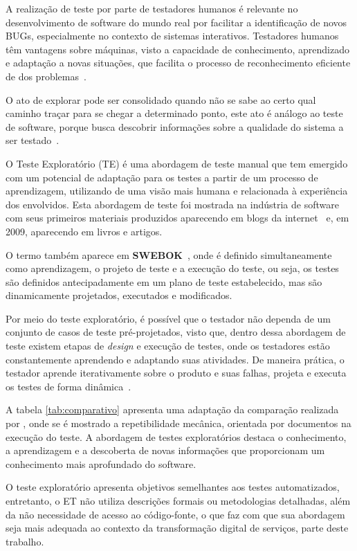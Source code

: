 A realização de teste por parte de testadores humanos é relevante no desenvolvimento de software do mundo real por facilitar a identificação de novos BUGs, especialmente no contexto de sistemas interativos. Testadores humanos têm vantagens sobre máquinas, visto a capacidade de conhecimento, aprendizado e adaptação a novas situações, que facilita o processo de reconhecimento eficiente de dos problemas~\cite{itkonen2015test}. 

O ato de explorar pode ser consolidado quando não se sabe ao certo qual caminho traçar para se chegar a determinado ponto, este ato é análogo ao teste de software, porque busca descobrir informações sobre a qualidade do sistema a ser testado~\cite{itkonen2015test}.

O Teste Exploratório (TE) é uma abordagem de teste manual que tem emergido com um potencial de adaptação para os testes a partir de um processo de aprendizagem, utilizando de uma visão mais humana e relacionada à experiência dos envolvidos. Esta abordagem de teste foi mostrada na indústria de software com seus primeiros materiais produzidos aparecendo em blogs da internet~\cite{kaner2000testing} e, em 2009, aparecendo em livros e artigos. 

O termo também aparece em \textbf{SWEBOK}~\cite{bourque2014guide}, onde é definido simultaneamente como aprendizagem, o projeto de teste 
e a execução do teste, ou seja, os testes são definidos antecipadamente em um plano de teste estabelecido, mas 
são dinamicamente projetados, executados e modificados.

Por meio do teste exploratório, é possível que o testador não dependa de um conjunto de casos de teste pré-projetados, visto que, dentro dessa abordagem de teste existem etapas de \textit{design} e execução de testes, onde os testadores estão constantemente aprendendo e 
adaptando suas atividades. De maneira prática, o testador aprende iterativamente sobre o produto e suas falhas, projeta e executa os testes de forma dinâmica~\cite{whittaker2009exploratory}.

A tabela \ref{tab:comparativo} apresenta uma adaptação da comparação realizada por \cite{itkonen2015test}, onde se é mostrado a repetibilidade mecânica, orientada por documentos na execução do teste. A abordagem de testes exploratórios destaca o conhecimento, a aprendizagem e a descoberta de novas informações que proporcionam um conhecimento mais aprofundado do software. 

O teste exploratório apresenta objetivos semelhantes aos testes automatizados, entretanto, o ET não utiliza descrições formais ou metodologias detalhadas, além da não necessidade de acesso ao código-fonte, o que faz com que sua abordagem seja mais adequada ao contexto da transformação digital de serviços, parte deste trabalho. 


